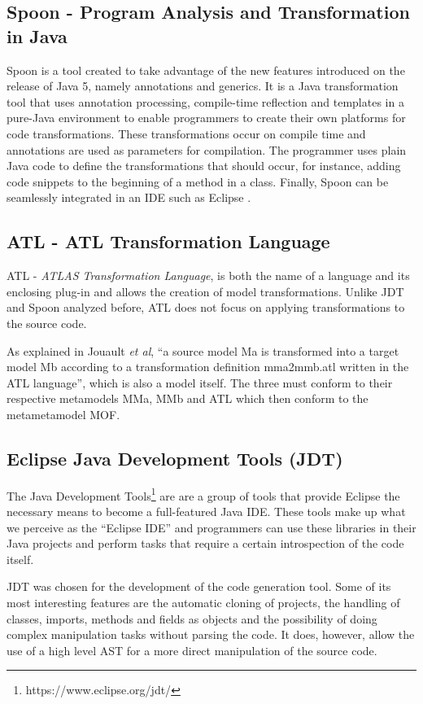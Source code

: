 \subsection{Spoon - Program Analysis and Transformation in Java}
	Spoon is a tool created to take advantage of the new features introduced on the release of Java 5, namely annotations and generics. It is a Java transformation tool that uses annotation processing, compile-time reflection and templates in a pure-Java environment to enable programmers to create their own platforms for code transformations. These transformations occur on compile time and annotations are used as parameters for compilation. The programmer uses plain Java code to define the transformations that should occur, for instance, adding code snippets to the beginning of a method in a class. Finally, Spoon can be seamlessly integrated in an IDE such as Eclipse \cite{pawlak2006spoon}.


\subsection{ATL - ATL Transformation Language }
	ATL - \emph{ATLAS Transformation Language}, is both the name of a language and its enclosing plug-in and allows the creation of model transformations. Unlike JDT and Spoon analyzed before, ATL does not focus on applying transformations to the source code.

	As explained in Jouault \emph{et al}, ``a source model Ma is transformed into a target model Mb according to a transformation definition mma2mmb.atl written in the ATL language'', which is also a model itself. The three must conform to their respective metamodels MMa, MMb and ATL which then conform to the metametamodel MOF.

\subsection{Eclipse Java Development Tools (JDT)}

	The Java Development Tools\footnote{https://www.eclipse.org/jdt/} are are a group of tools that provide Eclipse the necessary means to become a full-featured Java IDE.
	These tools make up what we perceive as the ``Eclipse IDE'' and programmers can use these libraries in their Java projects and perform tasks that require a certain introspection of the code itself. 

	JDT was chosen for the development of the code generation tool. Some of its most interesting features are the automatic cloning of projects, the handling of classes, imports, methods and fields as objects and the possibility of doing complex manipulation tasks without parsing the code. It does, however, allow the use of a high level AST for a more direct manipulation of the source code.

